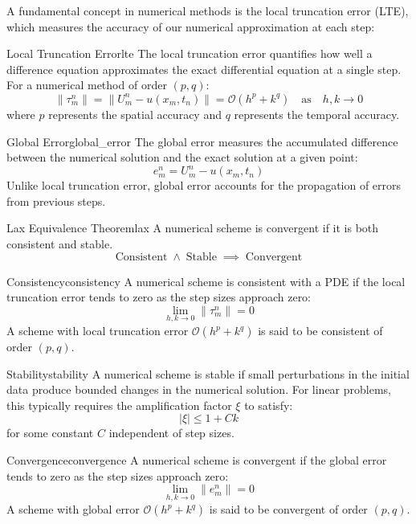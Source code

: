 A fundamental concept in numerical methods is the local truncation error (LTE), which measures the accuracy of our numerical approximation at each step:

\begin{definition}{Local Truncation Error}{lte}
  The local truncation error quantifies how well a difference equation approximates the exact differential equation at a single step. For a numerical method of order $(p,q)$:
  \[
    \|\tau_m^n\| = \|U_m^n-u(x_m, t_n)\| = \mathcal{O}(h^p + k^q) \quad \text{as} \quad h, k \to 0
  \]
  where $p$ represents the spatial accuracy and $q$ represents the temporal accuracy.
\end{definition}

\begin{definition}{Global Error}{global_error}
  The global error measures the accumulated difference between the numerical solution and the exact solution at a given point:
  \[
    e_m^n = U_m^n - u(x_m, t_n)
  \]
  Unlike local truncation error, global error accounts for the propagation of errors from previous steps.
\end{definition}

\begin{theorem}{Lax Equivalence Theorem}{lax}
  A numerical scheme is convergent if it is both consistent and stable.
  \[
    \operatorname{Consistent} \land \operatorname{Stable} \implies \operatorname{Convergent}
  \]
\end{theorem}

\begin{definition}{Consistency}{consistency}
  A numerical scheme is consistent with a PDE if the local truncation error tends to zero as the step sizes approach zero:
  \[
    \lim_{h,k \to 0} \|\tau_m^n\| = 0
  \]
  A scheme with local truncation error $\mathcal{O}(h^p + k^q)$ is said to be consistent of order $(p,q)$.
\end{definition}

\begin{definition}{Stability}{stability}
  A numerical scheme is stable if small perturbations in the initial data produce bounded changes in the numerical solution. For linear problems, this typically requires the amplification factor $\xi$ to satisfy:
  \[
    |\xi| \leq 1 + Ck
  \]
  for some constant $C$ independent of step sizes.
\end{definition}

\begin{definition}{Convergence}{convergence}
  A numerical scheme is convergent if the global error tends to zero as the step sizes approach zero:
  \[
    \lim_{h,k \to 0} \|e_m^n\| = 0
  \]
  A scheme with global error $\mathcal{O}(h^p + k^q)$ is said to be convergent of order $(p,q)$.
\end{definition}



